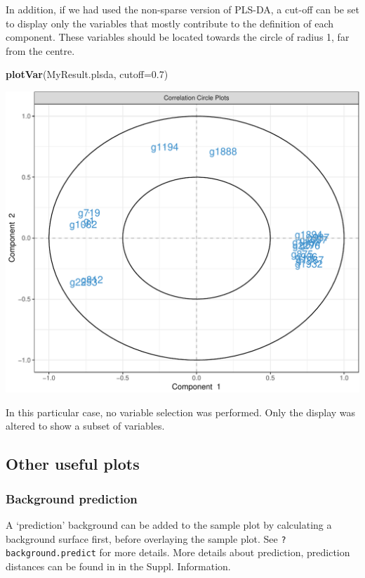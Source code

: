 \documentclass[]{book}
\newenvironment{Shaded}{\begin{snugshade}}{\end{snugshade}}
\newcommand{\DataTypeTok}[1]{\textcolor[rgb]{0.13,0.29,0.53}{#1}}
\newcommand{\FloatTok}[1]{\textcolor[rgb]{0.00,0.00,0.81}{#1}}
\newcommand{\KeywordTok}[1]{\textcolor[rgb]{0.13,0.29,0.53}{\textbf{#1}}}
\newcommand{\NormalTok}[1]{#1}
\begin{document}
In addition, if we had used the non-sparse version of PLS-DA, a cut-off can be set to display only the variables that mostly contribute to the definition of each component. These variables should be located towards the circle of radius 1, far from the centre.

\begin{Shaded}
\begin{Highlighting}[]
\KeywordTok{plotVar}\NormalTok{(MyResult.plsda, }\DataTypeTok{cutoff=}\FloatTok{0.7}\NormalTok{)}
\end{Highlighting}
\end{Shaded}

\begin{center}\includegraphics[width=0.5\linewidth]{Figures/04-plsda-plotVar-cutoff-1} \end{center}

In this particular case, no variable selection was performed. Only the display was altered to show a subset of variables.

\hypertarget{other-useful-plots-1}{%
\subsection{Other useful plots}\label{other-useful-plots-1}}

\hypertarget{background-prediction}{%
\subsubsection{Background prediction}\label{background-prediction}}

A `prediction' background can be added to the sample plot by calculating a background surface first, before overlaying the sample plot. See \texttt{?background.predict} for more details. More details about prediction, prediction distances can be found in \citep{mixomics} in the Suppl. Information.
\end{document}

